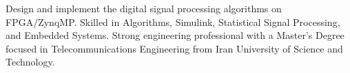 \par{
    Design and implement the digital signal processing algorithms on FPGA/ZynqMP.
    Skilled in Algorithms, Simulink, Statistical Signal Processing, and Embedded Systems.
    Strong engineering professional with a Master’s Degree focused in Telecommunications
    Engineering from Iran University of Science and Technology.
    \\
}